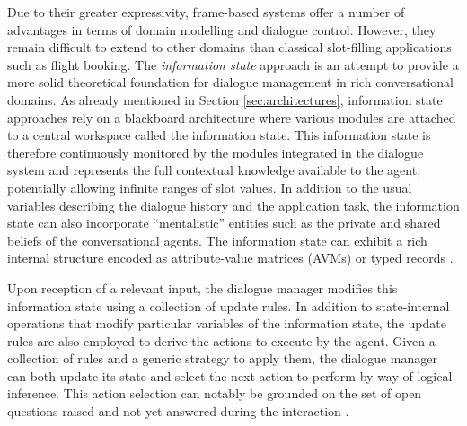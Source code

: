 Due to their greater expressivity, frame-based systems offer a number of advantages in terms of domain modelling and dialogue control.  However, they remain difficult to extend to other domains than classical slot-filling applications such as flight booking.  The \textit{information state} approach \citep{Larsson:2000} is an attempt to provide a more solid theoretical foundation for dialogue management in rich conversational domains.  As already mentioned in Section \ref{sec:architectures}, information state approaches rely on a blackboard architecture where various modules are attached to a central workspace called the information state. This information state is therefore continuously monitored by the modules integrated in the dialogue system and represents the full contextual knowledge available to the agent, potentially allowing infinite ranges of slot values. In addition to the usual variables describing the dialogue history and the application task, the information state can also incorporate ``mentalistic'' entities such as the private and shared beliefs of the conversational agents.  The information state can exhibit a rich internal structure encoded as attribute-value matrices (AVMs) or typed records  \citep{RobinCooper2012}. 

Upon reception of a relevant input, the dialogue manager modifies this information state using a collection of update rules. In addition to state-internal operations that modify particular variables of the information state, the update rules are also employed to derive the actions to execute by the agent.  Given a collection of rules and a generic strategy to apply them, the dialogue manager can both update its state and select the next action to perform by way of logical inference. This action selection can notably be grounded on the set of open questions raised and not yet answered during the interaction \citep{larsson2002,Ginzburg2012}.  

